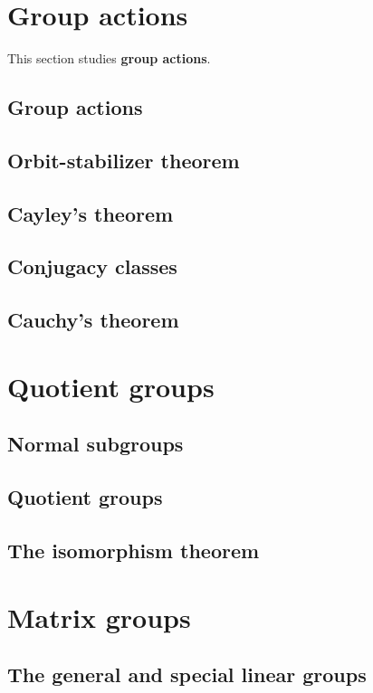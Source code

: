 \documentclass[12pt]{book}
\theoremstyle{definition}
\theoremstyle{remark}
\begin{document}
		\section{Group actions}
		This section studies \textbf{group actions}.
			\subsection{Group actions}
			
			\subsection{Orbit-stabilizer theorem}
			
			\subsection{Cayley's theorem}
			
			\subsection{Conjugacy classes}
			
			\subsection{Cauchy's theorem}
			
		\section{Quotient groups}
			\subsection{Normal subgroups}
			
			\subsection{Quotient groups}
			
			\subsection{The isomorphism theorem}
			
		\section{Matrix groups}
			\subsection{The general and special linear groups}
			
\end{document}
